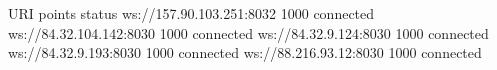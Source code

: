 \begin{shellbox}\begin{ttlst}
          URI             points   status  
ws://157.90.103.251:8032    1000  connected
ws://84.32.104.142:8030     1000  connected
 ws://84.32.9.124:8030      1000  connected
 ws://84.32.9.193:8030      1000  connected
 ws://88.216.93.12:8030     1000  connected
\end{ttlst}\end{shellbox}

